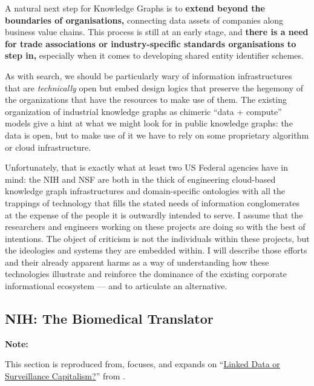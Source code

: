 \documentclass{article}
\renewenvironment{leftbar}
{\vspace{6pt}\def\FrameCommand{\hspace{0em}\vrule width 0.5pt \hspace{1em}}\MakeFramed {\advance\hsize-\width \FrameRestore}}
{\endMakeFramed}
\begin{document}
\begin{leftbar}
A natural next step for Knowledge Graphs is to \textbf{extend beyond the
boundaries of organisations,} connecting data assets of companies along
business value chains. This process is still at an early stage, and
\textbf{there is a need for trade associations or industry-specific
standards organisations to step in,} especially when it comes to
developing shared entity identifier schemes. \cite{panExploitingLinkedData2017} 
\end{leftbar}

As with search, we should be particularly wary of information
infrastructures that are \emph{technically} open but embed
design logics that preserve the hegemony of the organizations that have
the resources to make use of them. The existing organization of
industrial knowledge graphs as chimeric ``data + compute'' models give a
hint at what we might look for in public knowledge graphs: the data is
open, but to make use of it we have to rely on some proprietary
algorithm or cloud infrastructure.

Unfortunately, that is exactly what at least two US Federal agencies
have in mind: the NIH and NSF are both in the thick of engineering
cloud-based knowledge graph infrastructures and domain-specific
ontologies with all the trappings of technology that fills the stated
needs of information conglomerates at the expense of the people it is
outwardly intended to serve. I assume that the researchers and engineers
working on these projects are doing so with the best of intentions. The
object of criticism is not the individuals within these projects, but
the ideologies and systems they are embedded within. I will describe
those efforts and their already apparent harms as a way of understanding
how these technologies illustrate and reinforce the dominance of the
existing corporate informational ecosystem --- and to articulate an
alternative.

\hypertarget{nih-the-biomedical-translator}{%
\subsection{NIH: The Biomedical
Translator}\label{nih-the-biomedical-translator}}

\textbf{Note:}

This section is reproduced from, focuses, and expands on
``\href{https://jon-e.net/infrastructure/\#linked-data-or-surveillance-capitalism}{Linked
Data or Surveillance Capitalism?}'' from \cite{saundersDecentralizedInfrastructureNeuro2022} .
\end{document}
